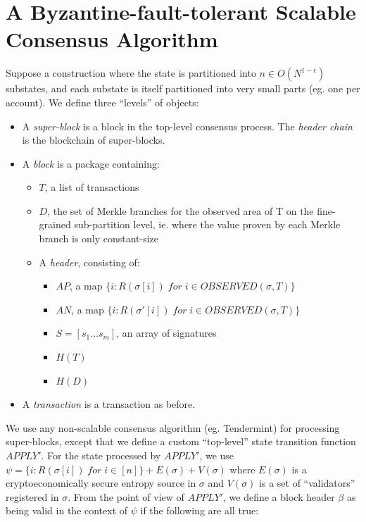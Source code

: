\documentclass[11pt,a4paper]{report}
\theoremstyle{plain}
\theoremstyle{definition}
\theoremstyle{remark}
\begin{document}
\chapter{A Byzantine-fault-tolerant Scalable Consensus Algorithm}

Suppose a construction where the state is partitioned into $n \in O(N^{1-\epsilon})$ substates, and each substate is itself partitioned into very small parts (eg. one per account). We define three ``levels'' of objects:

\begin{itemize}
\item
A \emph{super-block} is a block in the top-level consensus process. The \emph{header chain} is the blockchain of super-blocks.
\item
A \emph{block} is a package containing:

    \begin{itemize}
    \item
    $T$, a list of transactions
    \item
    $D$, the set of Merkle branches for the observed area of T on the fine-grained sub-partition level, ie. where the value proven by each Merkle branch is only constant-size
    \item
    A \emph{header}, consisting of:
        \begin{itemize}
        \item
        $AP$, a map $\{i: R(\sigma[i]) \; for \; i \in OBSERVED(\sigma, T)\}$
        \item
        $AN$, a map $\{i: R(\sigma'[i]) \; for \; i \in OBSERVED(\sigma, T)\}$
        \item
        $S = [s_1 ... s_m]$, an array of signatures
        \item
        $H(T)$
        \item
        $H(D)$
        \end{itemize}
    \end{itemize}
\item
A \emph{transaction} is a transaction as before.
\end{itemize}

We use any non-scalable consensus algorithm (eg. Tendermint\cite{tendermint}) for processing super-blocks, except that we define a custom ``top-level'' state transition function $APPLY'$. For the state processed by $APPLY'$, we use $\psi = \{i: R(\sigma[i]) \; for \; i \in [n]\} + E(\sigma) + V(\sigma)$ where $E(\sigma)$ is a cryptoeconomically secure entropy source in $\sigma$ and $V(\sigma)$ is a set of ``validators'' registered in $\sigma$. From the point of view of $APPLY'$, we define a block header $\beta$ as being valid in the context of $\psi$ if the following are all true:
\end{document}
